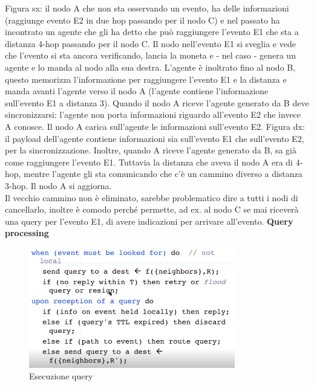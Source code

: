 \documentclass[12pt,italian]{report}
\begin{document}
\bigbreak
Figura sx: il nodo A che non sta osservando un evento, ha delle informazioni (raggiunge evento E2 in due hop passando per il nodo C) e nel passato ha incontrato un agente che gli ha detto che può raggiungere l'evento E1 che sta a distanza 4-hop passando per il nodo C. 
Il nodo nell'evento E1 si sveglia e vede che l'evento si sta ancora verificando, lancia la moneta e - nel caso - genera un agente e lo manda al nodo alla sua destra. L'agente è inoltrato fino al nodo B, questo memorizza l'informazione per raggiungere l'evento E1 e la distanza e manda avanti l'agente verso il nodo A (l'agente contiene l'informazione sull'evento E1 a distanza 3).  
Quando il nodo A riceve l'agente generato da B deve sincronizzarsi: l'agente non porta informazioni riguardo all'evento E2 che invece A conosce. Il nodo A carica sull'agente le informazioni sull'evento E2.
\bigbreak
Figura dx: il payload dell'agente contiene informazioni sia sull'evento E1 che sull'evento E2, per la sincronizzazione. Inoltre, quando A riceve l'agente generato da B, sa già come raggiungere l'evento E1. Tuttavia la distanza che aveva il nodo A era di 4-hop, mentre l'agente gli sta comunicando che c'è un cammino diverso a distanza 3-hop. Il nodo A si aggiorna. \\ Il vecchio cammino non è eliminato, sarebbe problematico dire a tutti i nodi di cancellarlo, inoltre è comodo perché permette, ad ex. al nodo C se mai riceverà una query per l'evento E1, di avere indicazioni per arrivare all'evento. 
\bigbreak
\noindent \textbf{Query processing} \\
\begin{figure}[h]
\centering
\includegraphics[width=90mm]{img/qyeru.PNG}
\caption{Esecuzione query}
\label{fig:eq}
\end{figure}
\bigbreak
\end{document}
